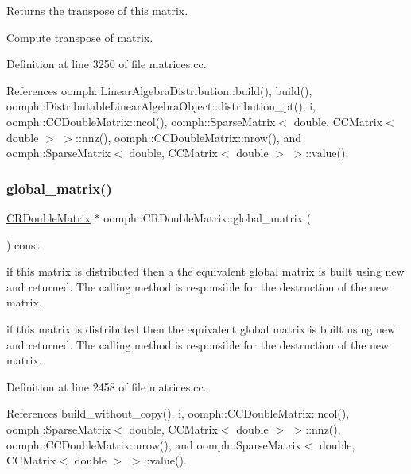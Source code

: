 Returns the transpose of this matrix. 

Compute transpose of matrix. 

Definition at line 3250 of file matrices.\+cc.



References oomph\+::\+Linear\+Algebra\+Distribution\+::build(), build(), oomph\+::\+Distributable\+Linear\+Algebra\+Object\+::distribution\+\_\+pt(), i, oomph\+::\+C\+C\+Double\+Matrix\+::ncol(), oomph\+::\+Sparse\+Matrix$<$ double, C\+C\+Matrix$<$ double $>$ $>$\+::nnz(), oomph\+::\+C\+C\+Double\+Matrix\+::nrow(), and oomph\+::\+Sparse\+Matrix$<$ double, C\+C\+Matrix$<$ double $>$ $>$\+::value().

\mbox{\label{classoomph_1_1CRDoubleMatrix_a984602c9df0c573451f315a025820ced}} 
\subsubsection{\texorpdfstring{global\+\_\+matrix()}{global\_matrix()}}
{\footnotesize\ttfamily \hyperlink{classoomph_1_1CRDoubleMatrix}{C\+R\+Double\+Matrix} $\ast$ oomph\+::\+C\+R\+Double\+Matrix\+::global\+\_\+matrix (\begin{DoxyParamCaption}{ }\end{DoxyParamCaption}) const}



if this matrix is distributed then a the equivalent global matrix is built using new and returned. The calling method is responsible for the destruction of the new matrix. 

if this matrix is distributed then the equivalent global matrix is built using new and returned. The calling method is responsible for the destruction of the new matrix. 

Definition at line 2458 of file matrices.\+cc.



References build\+\_\+without\+\_\+copy(), i, oomph\+::\+C\+C\+Double\+Matrix\+::ncol(), oomph\+::\+Sparse\+Matrix$<$ double, C\+C\+Matrix$<$ double $>$ $>$\+::nnz(), oomph\+::\+C\+C\+Double\+Matrix\+::nrow(), and oomph\+::\+Sparse\+Matrix$<$ double, C\+C\+Matrix$<$ double $>$ $>$\+::value().



